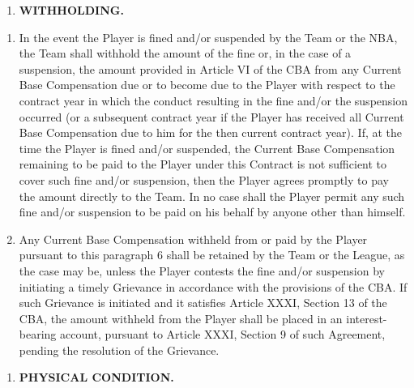 \documentclass[
]{book}
\providecommand{\tightlist}{%
  \setlength{\itemsep}{0pt}\setlength{\parskip}{0pt}}
\begin{document}
\begin{enumerate}
\def\labelenumi{\arabic{enumi}.}
\setcounter{enumi}{5}
\tightlist
\item
  \textbf{WITHHOLDING.}
\end{enumerate}

\begin{enumerate}
\def\labelenumi{(\alph{enumi})}
\tightlist
\item
  In the event the Player is fined and/or suspended by the Team or the NBA, the Team shall withhold the amount of the fine or, in the case of a suspension, the amount provided in Article VI of the CBA from any Current Base Compensation due or to become due to the Player with respect to the contract year in which the conduct resulting in the fine and/or the suspension occurred (or a subsequent contract year if the Player has received all Current Base Compensation due to him for the then current contract year). If, at the time the Player is fined and/or suspended, the Current Base Compensation remaining to be paid to the Player under this Contract is not sufficient to cover such fine and/or suspension, then the Player agrees promptly to pay the amount directly to the Team. In no case shall the Player permit any such fine and/or suspension to be paid on his behalf by anyone other than himself.
\item
  Any Current Base Compensation withheld from or paid by the Player pursuant to this paragraph 6 shall be retained by the Team or the League, as the case may be, unless the Player contests the fine and/or suspension by initiating a timely Grievance in accordance with the provisions of the CBA. If such Grievance is initiated and it satisfies Article XXXI, Section 13 of the CBA, the amount withheld from the Player shall be placed in an interest-bearing account, pursuant to Article XXXI, Section 9 of such Agreement, pending the resolution of the Grievance.
\end{enumerate}

\begin{enumerate}
\def\labelenumi{\arabic{enumi}.}
\setcounter{enumi}{6}
\tightlist
\item
  \textbf{PHYSICAL CONDITION.}
\end{enumerate}
\end{document}
